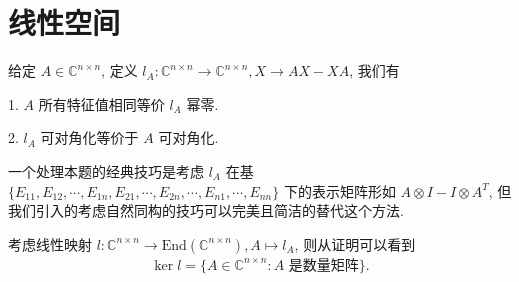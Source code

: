\documentclass[../../main.tex]{subfiles}
\begin{document}
\section{线性空间}

\begin{theorem}[Lie映射经典性质]\label{theorem:Lie映射经典性质}
给定 $A \in \mathbb{C}^{n \times n}$, 定义 $l_A: \mathbb{C}^{n \times n} \to \mathbb{C}^{n \times n}, X \to AX - XA$, 我们有

1. $A$ 所有特征值相同等价 $l_A$ 幂零.

2. $l_A$ 可对角化等价于 $A$ 可对角化.
\end{theorem}
\begin{note}
一个处理本题的经典技巧是考虑 $l_A$ 在基 $\{E_{11}, E_{12}, \cdots, E_{1n}, E_{21}, \cdots, E_{2n}, \cdots, E_{n1}, \cdots, E_{nn}\}$ 下的表示矩阵形如 $A \otimes I - I \otimes A^T$, 但我们引入的考虑自然同构的技巧可以完美且简洁的替代这个方法.
\end{note}
\begin{note}
考虑线性映射 $l: \mathbb{C}^{n \times n} \to \mathrm{End}(\mathbb{C}^{n \times n}), A \mapsto l_A$, 则从证明可以看到
\begin{align*}
\ker l = \{A \in \mathbb{C}^{n \times n} : A \text{ 是数量矩阵}\}.
\end{align*}
\end{note}
\end{document}
